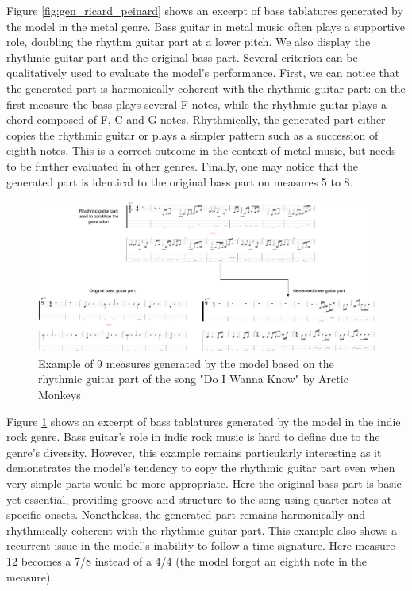 Figure \ref{fig:gen_ricard_peinard} shows an excerpt of bass tablatures generated by the model in the metal genre.
Bass guitar in metal music often plays a supportive role, doubling the rhythm guitar part at a lower pitch.
We also display the rhythmic guitar part and the original bass part.
Several criterion can be qualitatively used to evaluate the model's performance.
First, we can notice that the generated part is harmonically coherent with the rhythmic guitar part:
on the first measure the bass plays several F notes, while the rhythmic guitar plays a chord composed of F, C and G notes.
Rhythmically, the generated part either copies the rhythmic guitar or plays a simpler pattern such as a succession of eighth notes.
This is a correct outcome in the context of metal music, but needs to be further evaluated in other genres.
Finally, one may notice that the generated part is identical to the original bass part on measures 5 to 8.



\begin{figure}[!ht]
    \centering
    \includegraphics[width=\linewidth]{../images-figures/gen_arctic_monkeys.png}
    \caption{Example of 9 measures generated by the model based on the rhythmic guitar part of the song "Do I Wanna Know" by Arctic Monkeys}
    \label{fig:gen_arctic_monkeys}
\end{figure}

Figure \ref{fig:gen_arctic_monkeys} shows an excerpt of bass tablatures generated by the model in the indie rock genre.
Bass guitar's role in indie rock music is hard to define due to the genre's diversity.
However, this example remains particularly interesting as it demonstrates the model's tendency to copy the rhythmic guitar part even when very simple parts would be more appropriate.
Here the original bass part is basic yet essential, providing groove and structure to the song using quarter notes at specific onsets.
Nonetheless, the generated part remains harmonically and rhythmically coherent with the rhythmic guitar part.
This example also shows a recurrent issue in the model's inability to follow a time signature.
Here measure 12 becomes a 7/8 instead of a 4/4 (the model forgot an eighth note in the measure).


